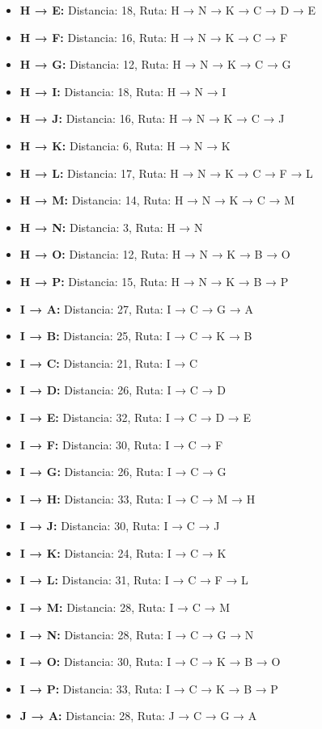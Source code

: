 \documentclass[12pt]{article}
\begin{document}
\begin{itemize}
\item \textbf{H → E:} Distancia: 18, Ruta: H → N → K → C → D → E
\item \textbf{H → F:} Distancia: 16, Ruta: H → N → K → C → F
\item \textbf{H → G:} Distancia: 12, Ruta: H → N → K → C → G
\item \textbf{H → I:} Distancia: 18, Ruta: H → N → I
\item \textbf{H → J:} Distancia: 16, Ruta: H → N → K → C → J
\item \textbf{H → K:} Distancia: 6, Ruta: H → N → K
\item \textbf{H → L:} Distancia: 17, Ruta: H → N → K → C → F → L
\item \textbf{H → M:} Distancia: 14, Ruta: H → N → K → C → M
\item \textbf{H → N:} Distancia: 3, Ruta: H → N
\item \textbf{H → O:} Distancia: 12, Ruta: H → N → K → B → O
\item \textbf{H → P:} Distancia: 15, Ruta: H → N → K → B → P
\item \textbf{I → A:} Distancia: 27, Ruta: I → C → G → A
\item \textbf{I → B:} Distancia: 25, Ruta: I → C → K → B
\item \textbf{I → C:} Distancia: 21, Ruta: I → C
\item \textbf{I → D:} Distancia: 26, Ruta: I → C → D
\item \textbf{I → E:} Distancia: 32, Ruta: I → C → D → E
\item \textbf{I → F:} Distancia: 30, Ruta: I → C → F
\item \textbf{I → G:} Distancia: 26, Ruta: I → C → G
\item \textbf{I → H:} Distancia: 33, Ruta: I → C → M → H
\item \textbf{I → J:} Distancia: 30, Ruta: I → C → J
\item \textbf{I → K:} Distancia: 24, Ruta: I → C → K
\item \textbf{I → L:} Distancia: 31, Ruta: I → C → F → L
\item \textbf{I → M:} Distancia: 28, Ruta: I → C → M
\item \textbf{I → N:} Distancia: 28, Ruta: I → C → G → N
\item \textbf{I → O:} Distancia: 30, Ruta: I → C → K → B → O
\item \textbf{I → P:} Distancia: 33, Ruta: I → C → K → B → P
\item \textbf{J → A:} Distancia: 28, Ruta: J → C → G → A

\end{itemize}
\end{document}
